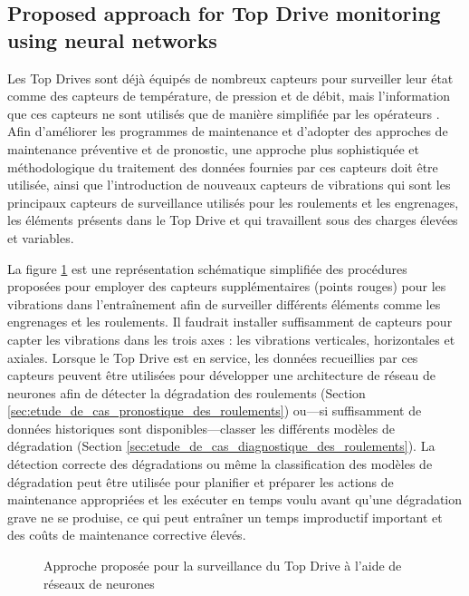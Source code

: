 \subsection{Proposed approach for Top Drive monitoring using neural networks}%
\label{sub:proposed_approach_for_top_drive_monitoring_using_neural_networks}

Les Top Drives sont déjà équipés de nombreux capteurs pour surveiller leur état comme des capteurs de température, de pression et de débit, mais l'information que ces capteurs ne sont utilisés que de manière simplifiée par les opérateurs \cite{Pournazari2016}. Afin d'améliorer les programmes de maintenance et d'adopter des approches de maintenance préventive et de pronostic, une approche plus sophistiquée et méthodologique du traitement des données fournies par ces capteurs doit être utilisée, ainsi que l'introduction de nouveaux capteurs de vibrations qui sont les principaux capteurs de surveillance utilisés pour les roulements et les engrenages, les éléments présents dans le Top Drive et qui travaillent sous des charges élevées et variables.

La figure \ref{fig:topdrive-drive-sensors} est une représentation schématique simplifiée des procédures proposées pour employer des capteurs supplémentaires (points rouges) pour les vibrations dans l'entraînement afin de surveiller différents éléments comme les engrenages et les roulements. Il faudrait installer suffisamment de capteurs pour capter les vibrations dans les trois axes : les vibrations verticales, horizontales et axiales. Lorsque le Top Drive est en service, les données recueillies par ces capteurs peuvent être utilisées pour développer une architecture de réseau de neurones afin de détecter la dégradation des roulements (Section \ref{sec:etude_de_cas_pronostique_des_roulements}) ou---si suffisamment de données historiques sont disponibles---classer les différents modèles de dégradation (Section \ref{sec:etude_de_cas_diagnostique_des_roulements}). La détection correcte des dégradations ou même la classification des modèles de dégradation peut être utilisée pour planifier et préparer les actions de maintenance appropriées et les exécuter en temps voulu avant qu'une dégradation grave ne se produise, ce qui peut entraîner un temps improductif important et des coûts de maintenance corrective élevés. 


\begin{figure}[H]
	\centering
	
	\caption{Approche proposée pour la surveillance du Top Drive à l'aide de réseaux de neurones}%
	\label{fig:topdrive-drive-sensors}
\end{figure}

